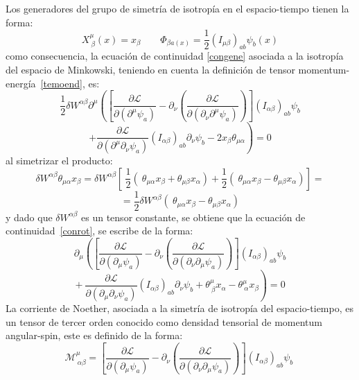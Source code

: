 \documentclass[a4paper,12pt]{article}
\begin{document}
Los generadores del grupo de simetría de isotropía en el espacio-tiempo tienen la forma:
\begin{equation}
X_{\ \beta}^\mu(x)=x_\beta \ \ \ \ \ \ \ \ \ \Phi_{\beta a(x)}=\frac{1}{2}(I_{\mu \beta})_{ab}\psi_{b}(x)
\end{equation}
como consecuencia, la ecuación de continuidad \eqref{congene} asociada a la isotropía del espacio de Minkowski, teniendo en cuenta la definición de tensor \mbox{momentum-energía \eqref{temoend},} es:
\begin{equation}
\frac{1}{2}\delta W^{\alpha\beta}\partial^\mu\left( \left[\frac{\partial \mathscr{L} }{\partial(\partial^{\mu} \psi_a)}-\partial_{\nu}\left(\frac{\partial\mathscr{L} }{\partial(\partial_{\nu}\partial^{\mu} \psi_a)}  \right) \right](I_{\alpha\beta})_{ab}\psi_{b}\right. 
\label{conrot}
\end{equation}
$$\left.+  \frac{\partial\mathscr{L} }{\partial(\partial^{\mu}\partial_{\nu} \psi_a)}(I_{\alpha\beta})_{ab}\partial_\nu\psi_{b}-2x_\beta\theta_{\mu \alpha}\right)=0$$
al simetrizar el producto:
\begin{equation}
\delta W^{\alpha\beta}\theta_{\mu\alpha}x_\beta=\delta W^{\alpha\beta}\left[\ \frac{1}{2}\left(\ \theta_{\mu\alpha}x_\beta +\theta_{\mu\beta}x_\alpha  \right)+\frac{1}{2}\left(\ \theta_{\mu\alpha}x_\beta -\theta_{\mu\beta}x_\alpha  \right) \right]=
\end{equation}
$$=\frac{1}{2}\delta W^{\alpha\beta}\left(\ \theta_{\mu\alpha}x_\beta -\theta_{\mu\beta}x_\alpha  \right) $$
y dado que $\delta W^{\alpha\beta}$ es un tensor constante, se obtiene que la ecuación de \mbox{continuidad \eqref{conrot}}, se escribe de la forma:
\begin{equation}
\partial_\mu\left( \left[\frac{\partial \mathscr{L} }{\partial(\partial_{\mu} \psi_a)}-\partial_{\nu}\left(\frac{\partial\mathscr{L} }{\partial(\partial_{\nu}\partial_{\mu} \psi_a)}  \right) \right](I_{\alpha\beta})_{ab}\psi_{b}\right.
\end{equation}
$$\left.+\ \frac{\partial\mathscr{L} }{\partial(\partial_{\mu}\partial_{\nu} \psi_a)}(I_{\alpha\beta})_{ab}\partial_\nu\psi_{b}+\theta_{\ \beta}^\mu x_\alpha-\theta_{\ \alpha}^\mu x_\beta  \right)=0  $$
La corriente de Noether, asociada a la simetría de isotropía del espacio-tiempo, es un tensor de tercer orden conocido como densidad tensorial de momentum angular-spin, este es definido de la forma:
\begin{equation}
\mathscr{M}_{\ \alpha\beta}^\mu=\left[\frac{\partial \mathscr{L} }{\partial(\partial_{\mu} \psi_a)}-\partial_{\nu}\left(\frac{\partial\mathscr{L} }{\partial(\partial_{\nu}\partial_{\mu} \psi_a)}  \right) \right](I_{\alpha\beta})_{ab}\psi_{b}\ 
\label{temoande} 
\end{equation}
\end{document}
